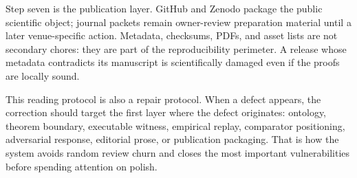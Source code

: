 Step seven is the publication layer. GitHub and Zenodo package the public scientific object; journal packets remain owner-review preparation material until a later venue-specific action. Metadata, checksums, PDFs, and asset lists are not secondary chores: they are part of the reproducibility perimeter. A release whose metadata contradicts its manuscript is scientifically damaged even if the proofs are locally sound.

This reading protocol is also a repair protocol. When a defect appears, the correction should target the first layer where the defect originates: ontology, theorem boundary, executable witness, empirical replay, comparator positioning, adversarial response, editorial prose, or publication packaging. That is how the system avoids random review churn and closes the most important vulnerabilities before spending attention on polish.
